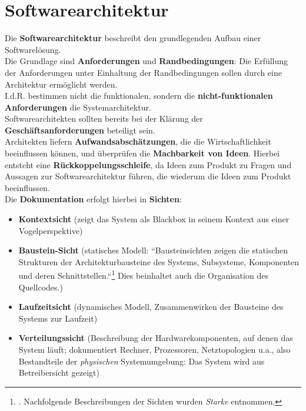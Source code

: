 \section{Softwarearchitektur}

\begin{tcolorbox}[title=Softwarearchitektur]
Die \textbf{Softwarearchitektur} beschreibt den grundlegenden Aufbau einer Softwarelösung.\\
Die Grundlage sind \textbf{Anforderungen} und \textbf{Randbedingungen}: Die Erfüllung der Anforderungen unter Einhaltung der Randbedingungen sollen durch eine Architektur ermöglicht werden.\\
I.d.R. bestimmen nicht die funktionalen, sondern die \textbf{nicht-funktionalen Anforderungen} die Systemarchitektur.\\

\noindent
Softwarearchitekten sollten bereits bei der Klärung der \textbf{Geschäftsanforderungen} beteiligt sein.\\
Architekten liefern \textbf{Aufwandsabschätzungen}, die die Wirtschaftlichkeit beeinflussen können, und überprüfen die \textbf{Machbarkeit von Ideen}.
Hierbei entsteht eine \textbf{Rückkoppelungsschleife}, da Ideen zum Produkt zu Fragen und Aussagen zur Softwarearchitektur führen, die wiederum die Ideen zum Produkt beeinflussen.\\

\noindent
Die \textbf{Dokumentation} erfolgt hierbei in \textbf{Sichten}:
\begin{itemize}
    \item \textbf{Kontextsicht} (zeigt das System als Blackbox in seinem Kontext aus einer Vogelperspektive)
    \item \textbf{Baustein-Sicht} (statisches Modell: ``Bausteinsichten zeigen die statischen Strukturen der Architekturbausteine des Systems, Subsysteme, Komponenten und deren Schnittstellen.``\footnote{
        \cite[81]{Sta14e}.
        Nachfolgende Beschreibungen der Sichten wurden \textit{Starke} entnommen.
    } Dies beinhaltet auch die Organisation des Quellcodes.)
    \item \textbf{Laufzeitsicht} (dynamisches Modell, Zusammenwirken der Bausteine des Systems zur Laufzeit)
    \item \textbf{Verteilungssicht} (Beschreibung der Hardwarekomponenten, auf denen das System läuft; dokumentiert Rechner, Prozessoren, Netztopologien u.a., also Bestandteile der \textit{physischen} Systemumgebung: Das System wird aus Betreibersicht gezeigt)
\end{itemize}
\end{tcolorbox}
